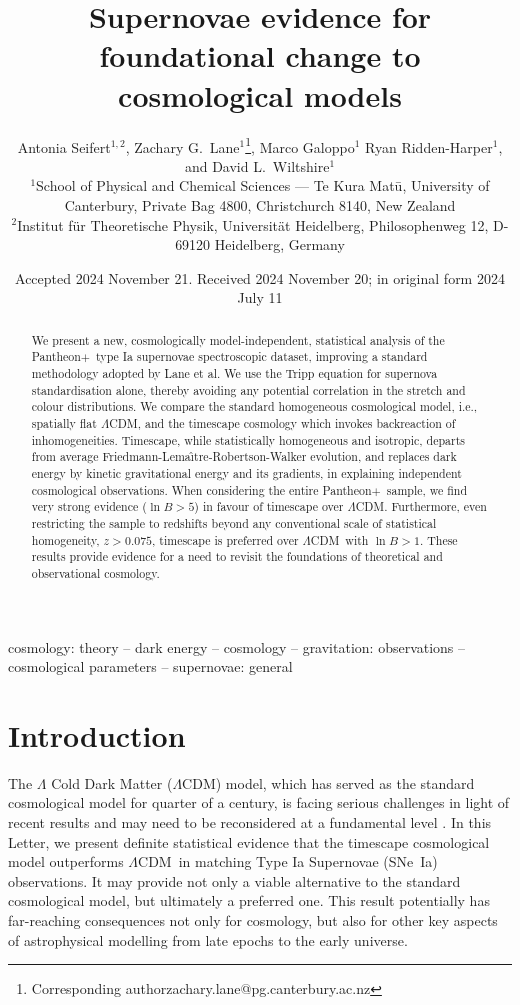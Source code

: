 \documentclass[fleqn,usenatbib,onecolumn,referee]{mnras}
\title[Evidence for fundamental change in cosmology]{Supernovae evidence for foundational change to cosmological models}
\author[Seifert et al.]{\fontsize{13pt}{16pt}\selectfont Antonia Seifert$^{1,2}$\orcidlink{0009-0005-9892-3667}, Zachary G.~Lane$^{1}$\orcidlink{0009-0003-8380-4003}\thanks{Corresponding author\newline zachary.lane@pg.canterbury.ac.nz}, Marco Galoppo$^1$\orcidlink{ 0000-0003-2783-3603}\newauthor \fontsize{13pt}{16pt}\selectfont
Ryan Ridden-Harper$^{1}$\orcidlink{0000-0003-1724-2885},
and David L.~Wiltshire$^{1}$\orcidlink{0000-0003-1992-6682}
\\
$^{1}$School of Physical and Chemical Sciences — Te Kura Mat\={u}, University of Canterbury, Private Bag 4800, Christchurch 8140, New Zealand\\
$^{2}$Institut f\"ur Theoretische Physik, Universit\"at Heidelberg, Philosophenweg 12, D-69120 Heidelberg, Germany\\ 
}
\date{Accepted 2024 November 21. Received 2024 November 20; in original form 2024 July 11}
\newcommand{\pplus}{Pantheon$+$}
\newcommand{\LA}{\Lambda}
\newcommand{\LCDM}{$\LA$CDM}
\newcommand{\lcdm}{spatially flat $\LA$CDM}
\newcommand{\sne}{SNe~Ia}
\begin{document}
\label{firstpage}
\pagerange{\pageref{firstpage}--\pageref{lastpage}}
\maketitle


\begin{abstract}

We present a new, cosmologically model-independent, statistical analysis of the \pplus\ type Ia supernovae spectroscopic dataset, improving a standard methodology adopted by Lane et al. We use the Tripp equation for supernova standardisation alone, thereby avoiding any potential correlation in the stretch and colour distributions. We compare the standard homogeneous cosmological model, i.e., \lcdm, and the timescape cosmology which invokes backreaction of inhomogeneities. Timescape, while statistically homogeneous and isotropic, departs from average Friedmann-Lema\^{\i}tre-Robertson-Walker evolution, and replaces dark energy by kinetic gravitational energy and its gradients, in explaining independent cosmological observations. When considering the entire \pplus\ sample, we find very strong evidence ($\ln B> 5$) in favour of timescape over \LCDM. Furthermore, even restricting the sample to redshifts beyond any conventional scale of statistical homogeneity, $z > 0.075$, timescape  is preferred over \LCDM\ with $\ln B> 1$. These results provide evidence for a need to revisit the foundations of theoretical and observational cosmology.
\end{abstract}

\begin{keywords}
cosmology: theory -- dark energy -- cosmology -- gravitation: observations -- cosmological parameters -- supernovae: general

\end{keywords}


\section{Introduction}\label{sec:intro}

The $\Lambda$ Cold Dark Matter (\LCDM) model, which has served as %
the standard cosmological model for quarter of a century, is facing serious challenges in light of recent results \citep{DES_2024, DESI_2024} and may need to be reconsidered at a fundamental level \citep{Di_Valentino_2021, Peebles_2022, Aluri_2022}. In this Letter, we present definite statistical evidence that the timescape cosmological model \citep{Wiltshire_2007_clocks,Wiltshire_2007_sol,Wiltshire_2009_obs} outperforms \LCDM\ in matching Type Ia Supernovae (\sne) observations. It may provide not only a viable alternative to the standard cosmological model, but ultimately a preferred one. This result potentially has far-reaching consequences not only for cosmology, but also for other key aspects of astrophysical modelling from late epochs to the early universe. 
\end{document}
